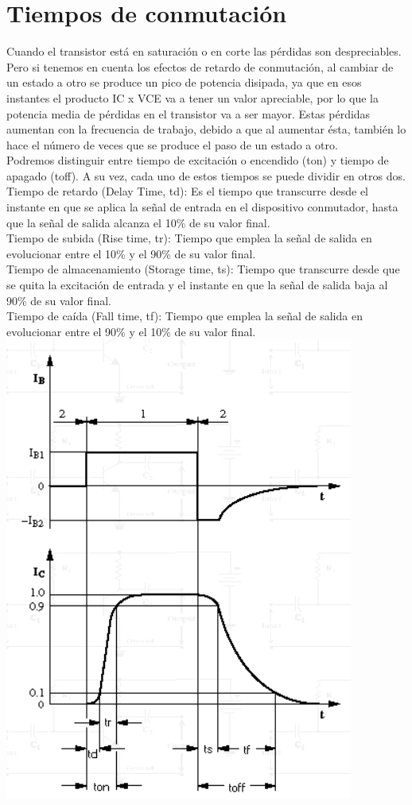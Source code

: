 \documentclass[10pt,a4paper]{article}
\begin{document}
\section{Tiempos de conmutación}
Cuando el transistor está en saturación o en corte las pérdidas son despreciables. Pero si tenemos en cuenta los efectos de retardo de conmutación, al cambiar de un estado a otro se produce un pico de potencia disipada, ya que en esos instantes el producto IC x VCE va a tener un valor apreciable, por lo que la potencia media de pérdidas en el transistor va a ser mayor. Estas pérdidas aumentan con la frecuencia de trabajo, debido a que al aumentar ésta, también lo hace el número de veces que se produce el paso de un estado a otro.\\
\bigskip
Podremos distinguir entre tiempo de excitación o encendido (ton) y tiempo de apagado (toff). A su vez, cada uno de estos tiempos se puede dividir en otros dos.\\
\bigskip
Tiempo de retardo (Delay Time, td): Es el tiempo que transcurre desde el instante en que se aplica la señal de entrada en el dispositivo conmutador, hasta que la señal de salida alcanza el 10\% de su valor final.\\
\bigskip
Tiempo de subida (Rise time, tr): Tiempo que emplea la señal de salida en evolucionar entre el 10\% y el 90\% de su valor final.\\
\bigskip
Tiempo de almacenamiento (Storage time, ts): Tiempo que transcurre desde que se quita la excitación de entrada y el instante en que la señal de salida baja al 90\% de su valor final.\\
\bigskip
Tiempo de caída (Fall time, tf): Tiempo que emplea la señal de salida en evolucionar entre el 90\% y el 10\% de su valor final.\\
\bigskip
\centering
\includegraphics[scale=.70]{graf.png}\\
\end{document}
